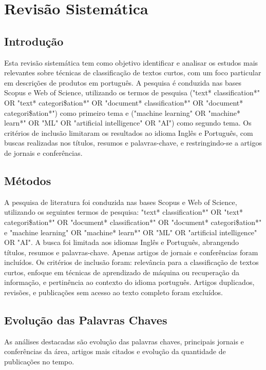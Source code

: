 \chapter{Revisão Sistemática}

\section{Introdução}

Esta revisão sistemática tem como objetivo identificar e analisar os estudos mais relevantes sobre técnicas de classificação de textos curtos, com um foco particular em descrições de produtos em português. A pesquisa é conduzida nas bases Scopus e Web of Science, utilizando os termos de pesquisa ("text* classification*" OR "text* categori\$ation*" OR "document* classification*" OR "document* categori\$ation*") como primeiro tema e ("machine learning" OR "machine* learn*" OR "ML" OR "artificial intelligence" OR "AI") como segundo tema. Os critérios de inclusão limitaram os resultados ao idioma Inglês e Português, com buscas realizadas nos títulos, resumos e palavras-chave, e restringindo-se a artigos de jornais e conferências.

\section{Métodos}

A pesquisa de literatura foi conduzida nas bases Scopus e Web of Science, utilizando os seguintes termos de pesquisa: "text* classification*" OR "text* categori\$ation*" OR "document* classification*" OR "document* categori\$ation*" e "machine learning" OR "machine* learn*" OR "ML" OR "artificial intelligence" OR "AI". A busca foi limitada aos idiomas Inglês e Português, abrangendo títulos, resumos e palavras-chave. Apenas artigos de jornais e conferências foram incluídos. Os critérios de inclusão foram: relevância para a classificação de textos curtos, enfoque em técnicas de aprendizado de máquina ou recuperação da informação, e pertinência ao contexto do idioma português. Artigos duplicados, revisões, e publicações sem acesso ao texto completo foram excluídos.

\section{Evolução das Palavras Chaves}

As análises destacadas são evolução das palavras chaves, principais jornais e conferências da área, artigos mais citados e evolução da quantidade de publicações no tempo.

